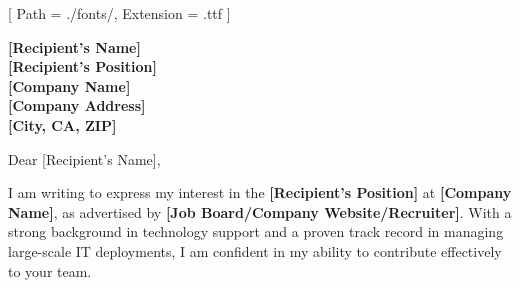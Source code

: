 


\newcommand{\RecipientName}{[Recipient's Name]}
\newcommand{\RecipientPosition}{[Recipient's Position]}
\newcommand{\CompanyName}{[Company Name]}
\newcommand{\CompanyAddress}{[Company Address]}
\newcommand{\CompanyCityStateZIP}{[City, CA, ZIP]}
\newcommand{\JobSource}{[Job Board/Company Website/Recruiter]}
\newcommand{\SpecificReason}{[Specific reason related to the company or position]}

\renewcommand{\photo}[2]{}

\ifmonochrome
  \renewcommand{\marginpar}[1]{}
\fi

\geometry{
  left=2cm,
  right=2cm,
  top=2cm,
  bottom=2cm,
  portrait
}

\setmainfont{NotoSans-Regular}[
  Path = ./fonts/,
  Extension = .ttf
]




\makecvheader

\vspace{1cm}

\textbf{\RecipientName} \\
\textbf{\RecipientPosition} \\
\textbf{\CompanyName} \\
\textbf{\CompanyAddress} \\
\textbf{\CompanyCityStateZIP}

\vspace{0.5cm}

\noindent Dear \RecipientName,

\vspace{0.5cm}

\justifying

I am writing to express my interest in the \textbf{\RecipientPosition} at \textbf{\CompanyName}, as advertised by \textbf{\JobSource}. With a strong background in technology support and a proven track record in managing large-scale IT deployments, I am confident in my ability to contribute effectively to your team.

